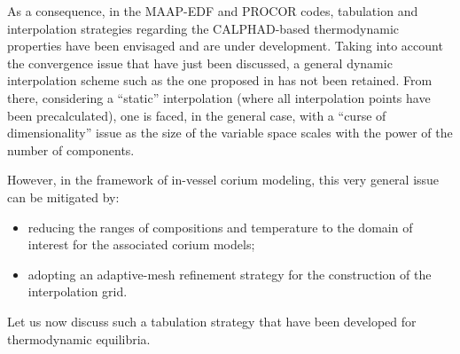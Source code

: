 \documentclass[11pt]{article}\usepackage{geometry} \geometry{letterpaper, margin=25.4mm}
\begin{document}
As a consequence, in the MAAP-EDF and PROCOR codes, tabulation and interpolation strategies regarding the CALPHAD-based thermodynamic properties have been envisaged and are under development. Taking into account the convergence issue that have just been discussed, a general dynamic interpolation scheme such as the one proposed in \cite{Larsson2015} has not been retained. From there, considering a ``static'' interpolation (where all interpolation points have been precalculated), one is faced, in the general case,  with a ``curse of dimensionality'' issue as the size of the variable space scales with the power of the number of components. 

However, in the framework of in-vessel corium modeling, this very general issue can be mitigated by:
\begin{itemize}
 \item reducing the ranges of compositions and temperature to the domain of interest for the associated corium models;
 \item adopting an adaptive-mesh refinement strategy for the construction of the interpolation grid.
\end{itemize}

Let us now discuss such a tabulation strategy that have been developed for thermodynamic equilibria.
\end{document}
